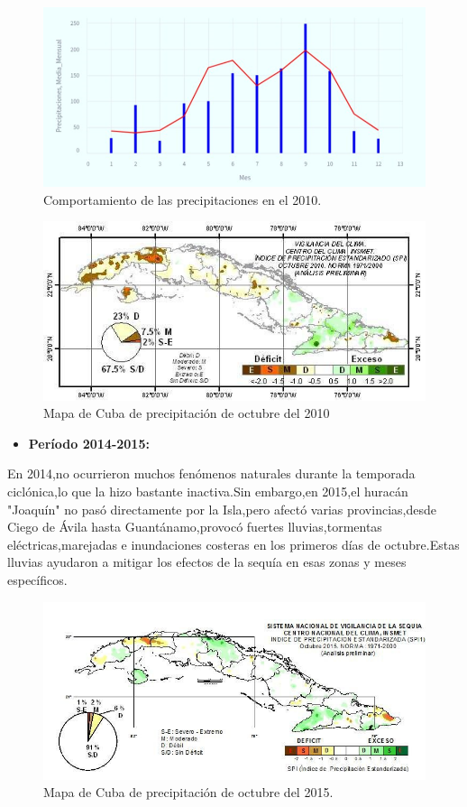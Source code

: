 \documentclass[12pt]{article}
\begin{document}
	\begin{figure}[H]
		\centering
		\includegraphics[width=0.6\linewidth]{./Report/images/precipitaciones_2010}
		\caption{Comportamiento de las precipitaciones en el 2010.}
		\label{fig:precipitaciones2010}
	\end{figure}
	
	
	\begin{figure}[H]
		\centering
		\includegraphics[width=0.7\linewidth]{./Report/images/mapa}
		\caption{Mapa de Cuba de precipitación de octubre del 2010}
		\label{fig:mapa}
	\end{figure}
	
	\begin{itemize}
		\item \textbf{Período 2014-2015:}
	\end{itemize}
	
	
	En 2014,no ocurrieron muchos fenómenos naturales durante la temporada ciclónica,lo que la hizo bastante inactiva.Sin embargo,en 2015,el huracán "Joaquín" no pasó directamente por la Isla,pero afectó varias provincias,desde Ciego de Ávila hasta Guantánamo,provocó fuertes lluvias,tormentas eléctricas,marejadas e inundaciones costeras en los primeros días de octubre.Estas lluvias ayudaron a mitigar los efectos de la sequía en esas zonas y meses específicos.\cite{webpage6}\cite{webpage8}
	
	\begin{figure}[H]
		\centering
		\includegraphics[width=0.7\linewidth]{./Report/images/mapa_octubre_2015}
		\caption{Mapa de Cuba de precipitación de octubre del 2015.}
		\label{fig:mapaoctubre2015}
	\end{figure}
	
\end{document}
